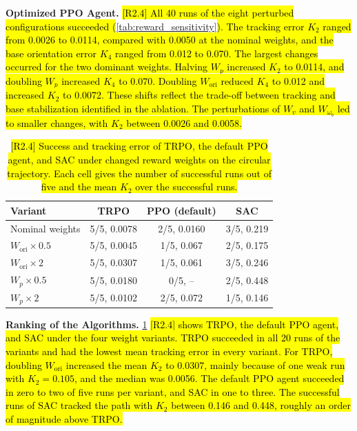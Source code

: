 \documentclass{ieeeaccess}
\newcommand{\hlone}[1]{{\sethlcolor{rone}\hl{#1}}}
\begin{document}
\textbf{Optimized PPO Agent.} \hlone{[R2.4] All 40 runs of the eight perturbed configurations succeeded
(}\cref{tab:reward_sensitivity}\hlone{). The tracking error $K_2$ ranged from 0.0026 to 0.0114, compared with
0.0050 at the nominal weights, and the base orientation error $K_4$ ranged from 0.012 to 0.070. The largest
changes occurred for the two dominant weights. Halving $W_p$ increased $K_2$ to 0.0114, and doubling $W_p$
increased $K_4$ to 0.070. Doubling $W_{\mathrm{ori}}$ reduced $K_4$ to 0.012 and increased $K_2$ to 0.0072.
These shifts reflect the trade-off between tracking and base stabilization identified in the ablation. The
perturbations of $W_v$ and $W_{\omega_b}$ led to smaller changes, with $K_2$ between 0.0026 and 0.0058.}

\begin{table}[!t]
    \centering
    \caption{\hlone{[R2.4] Success and tracking error of TRPO, the default PPO agent, and SAC under changed reward weights
    on the circular trajectory. Each cell gives the number of successful runs out of five and the mean $K_2$
    over the successful runs.}}
    \label{tab:reward_ranking}
    \renewcommand{\arraystretch}{1.2}
    \setlength{\tabcolsep}{4pt}
    \begin{tabular}{lccc}
        \toprule
        \textbf{Variant} & \textbf{TRPO} & \textbf{PPO (default)} & \textbf{SAC} \\
        \midrule
        Nominal weights & 5/5, 0.0078 & 2/5, 0.0160 & 3/5, 0.219 \\
        $W_{\mathrm{ori}} \times 0.5$ & 5/5, 0.0045 & 1/5, 0.067 & 2/5, 0.175 \\
        $W_{\mathrm{ori}} \times 2$ & 5/5, 0.0307 & 1/5, 0.061 & 3/5, 0.246 \\
        $W_p \times 0.5$ & 5/5, 0.0180 & 0/5, -- & 2/5, 0.448 \\
        $W_p \times 2$ & 5/5, 0.0102 & 2/5, 0.072 & 1/5, 0.146 \\
        \bottomrule
    \end{tabular}
\end{table}

\textbf{Ranking of the Algorithms.} \cref{tab:reward_ranking} \hlone{[R2.4] shows TRPO, the default PPO
agent, and SAC under the four weight variants. TRPO succeeded in all 20 runs of the variants and had the
lowest mean tracking error in every variant. For TRPO, doubling $W_{\mathrm{ori}}$ increased the mean
$K_2$ to 0.0307, mainly because of one weak run with $K_2 = 0.105$, and the median was 0.0056. The
default PPO agent succeeded in zero to two of five runs per variant, and SAC in one to three. The
successful runs of SAC tracked the path with $K_2$ between 0.146 and 0.448, roughly an order of magnitude
above TRPO.}
\end{document}
